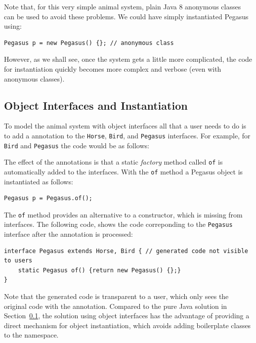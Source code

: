Note that, for this very simple animal system, plain Java 8 anonymous
classes can be used to avoid these problems.  We could have simply
instantiated Pegasus using:

\begin{lstlisting}
Pegasus p = new Pegasus() {}; // anonymous class
\end{lstlisting}

However, as we shall see, once the system gets a little more
complicated, the code for instantiation quickly becomes more 
complex and verbose (even with anonymous classes). 

\subsection{Object Interfaces and Instantiation} 

To model the animal system with object interfaces all that a user
needs to do is to add a \mixin annotation to the \texttt{Horse}, 
\texttt{Bird}, and \texttt{Pegasus} interfaces.  For example, 
for \texttt{Bird} and \texttt{Pegasus} the code would be as follows: 


The effect of the annotations is that a static \emph{factory} method called
\texttt{of} is automatically added to the interfaces. With the
\texttt{of} method a Pegasus object is instantiated as follows:

\begin{lstlisting}
Pegasus p = Pegasus.of();
\end{lstlisting}

\noindent The \texttt{of} method provides an alternative to a
constructor, which is missing from interfaces. The following code,
shows the code correponding to the \texttt{Pegasus} interface
after the \mixin annotation is processed:

\begin{lstlisting}
interface Pegasus extends Horse, Bird { // generated code not visible to users
	static Pegasus of() {return new Pegasus() {};}
}
\end{lstlisting}

\noindent Note that the generated code is transparent to a user, which
only sees the original code with the \mixin annotation. Compared to the pure
Java solution in Section~\ref{}, the solution using object interfaces
has the advantage of providing a direct mechanism for object
instantiation, which avoids adding boilerplate classes to the
namespace. 


